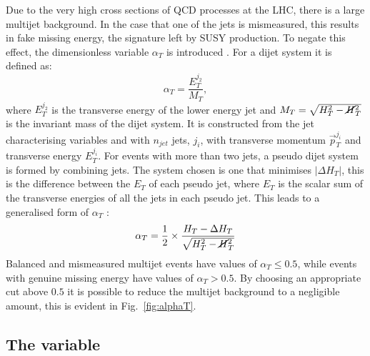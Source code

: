 Due to the very high cross sections of QCD processes at the LHC, there
is a large multijet background. In the case that one of the jets is
mismeasured, this results in fake missing energy, the signature left
by SUSY production. To negate this effect, the dimensionless variable
$\alpha_T$ is introduced
\cite{AlphaTproposalCMS:2008vya,AlphaTproposalPhysRevLett.101.221803}.
For a dijet system it is defined as: 
\begin{equation}
\alpha_T=\frac{E_T^{j_2}}{M_T}, \end{equation} 
where $E_T^{j_2}$ is
the transverse energy of the lower energy jet and
$M_T=\sqrt{H_T^2-\cancel{H}_T^2}$ is the invariant mass of the dijet
system. It is constructed from the jet characterising variables \HT
and \MHT
with $n_{jet}$ jets, $j_i$, with transverse momentum
$\vec{p}_T^{j_i}$ and transverse energy $E_T^{j_i}$. For events with
more than two jets, a pseudo dijet system is formed by combining jets.
The system chosen is one that minimises $|\Delta H_T|$, this is the
difference between the $E_T$ of each pseudo jet, where $E_T$ is the
scalar sum of the transverse energies of all the jets in each pseudo
jet. This leads to a generalised form of $\alpha_T$
\cite{AlphaT8TeVChatrchyan:2013lya}: 
\begin{equation}
\alpha_T=\frac{1}{2}\times\frac{H_T-\Delta
H_T}{\sqrt{H_T^2-\cancel{H}_T^2}} \end{equation} 
Balanced and
mismeasured multijet events have values of $\alpha_T\leq0.5$, while
events with genuine missing energy have values of $\alpha_T>0.5$. By
choosing an appropriate cut above $0.5$ it is possible to reduce the
multijet background to a negligible amount, this is evident in
Fig.~\ref{fig:alphaT}. 


\subsection{The \bdphi variable}

